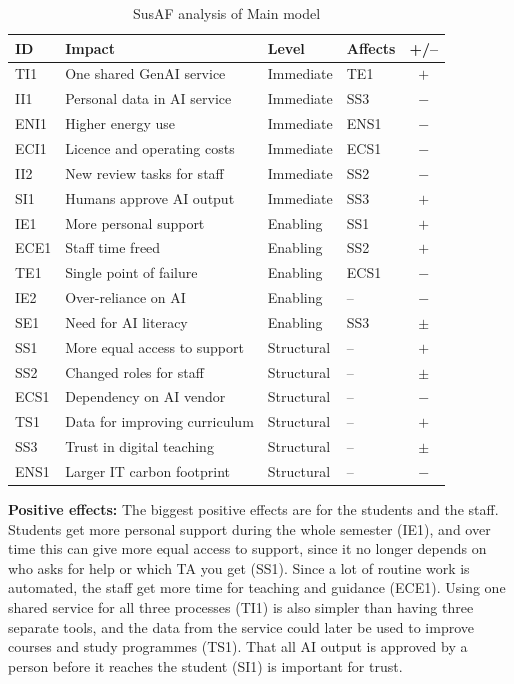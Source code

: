 \begin{table}[H]
    \centering
    \small
    \begin{tabularx}{\textwidth}{|l|X|l|l|c|}
        \hline
        \textbf{ID} & \textbf{Impact} & \textbf{Level} & \textbf{Affects} & \textbf{+/--} \\ \hline
        TI1 & One shared GenAI service & Immediate & TE1 & $+$ \\ \hline
        II1 & Personal data in AI service & Immediate & SS3 & $-$ \\ \hline
        ENI1 & Higher energy use & Immediate & ENS1 & $-$ \\ \hline
        ECI1 & Licence and operating costs & Immediate & ECS1 & $-$ \\ \hline
        II2 & New review tasks for staff & Immediate & SS2 & $-$ \\ \hline
        SI1 & Humans approve AI output & Immediate & SS3 & $+$ \\ \hline
        IE1 & More personal support & Enabling & SS1 & $+$ \\ \hline
        ECE1 & Staff time freed & Enabling & SS2 & $+$ \\ \hline
        TE1 & Single point of failure & Enabling & ECS1 & $-$ \\ \hline
        IE2 & Over-reliance on AI & Enabling & -- & $-$ \\ \hline
        SE1 & Need for AI literacy & Enabling & SS3 & $\pm$ \\ \hline
        SS1 & More equal access to support & Structural & -- & $+$ \\ \hline
        SS2 & Changed roles for staff & Structural & -- & $\pm$ \\ \hline
        ECS1 & Dependency on AI vendor & Structural & -- & $-$ \\ \hline
        TS1 & Data for improving curriculum & Structural & -- & $+$ \\ \hline
        SS3 & Trust in digital teaching & Structural & -- & $\pm$ \\ \hline
        ENS1 & Larger IT carbon footprint & Structural & -- & $-$ \\ \hline
    \end{tabularx}
    \caption{SusAF analysis of Main model}
    \label{tab:susaf-main}
\end{table}

\textbf{Positive effects:} The biggest positive effects are for the students and the staff. Students get more personal support during the whole semester (IE1), and over time this can give more equal access to support, since it no longer depends on who asks for help or which TA you get (SS1). Since a lot of routine work is automated, the staff get more time for teaching and guidance (ECE1). Using one shared service for all three processes (TI1) is also simpler than having three separate tools, and the data from the service could later be used to improve courses and study programmes (TS1). That all AI output is approved by a person before it reaches the student (SI1) is important for trust.

